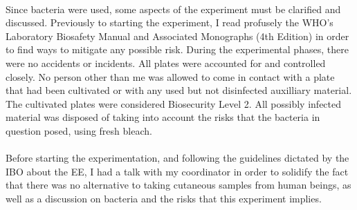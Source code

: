 \paragraph{}Since bacteria were used, some aspects of the experiment must be clarified and discussed. Previously to starting the experiment, I read profusely the WHO's Laboratory Biosafety Manual and Associated Monographs (4th Edition)\cite{worldhealthorganizationLaboratoryBiosafetyManual2020} in order to find ways to mitigate any possible risk. During the experimental phases, there were no accidents or incidents. All plates were accounted for and controlled closely. No person other than me was allowed to come in contact with a plate that had been cultivated or with any used but not disinfected auxilliary material. The cultivated plates were considered Biosecurity Level 2. All possibly infected material was disposed of taking into account the risks that the bacteria in question posed, using fresh bleach.
\paragraph{}Before starting the experimentation, and following the guidelines dictated by the IBO about the EE, I had a talk with my coordinator in order to solidify the fact that there was no alternative to taking cutaneous samples from human beings, as well as a discussion on bacteria and the risks that this experiment implies.
